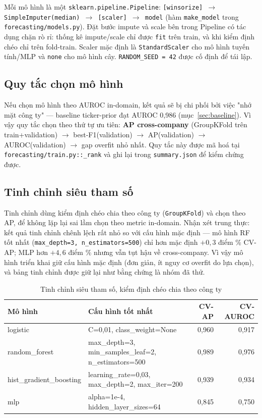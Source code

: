 Mỗi mô hình là một \texttt{sklearn.pipeline.Pipeline}:
\texttt{[winsorize] $\rightarrow$ SimpleImputer(median) $\rightarrow$ [scaler] $\rightarrow$ model}
(hàm \texttt{make\_model} trong \texttt{forecasting/models.py}). Đặt bước impute và scale bên trong
Pipeline có tác dụng chặn rò rỉ: thống kê impute/scale chỉ được \texttt{fit} trên train, và khi kiểm
định chéo chỉ trên fold-train. Scaler mặc định là \texttt{StandardScaler} cho mô hình tuyến
tính/MLP và \texttt{none} cho mô hình cây. \texttt{RANDOM\_SEED = 42} được cố định để tái lập.

\subsection{Quy tắc chọn mô hình}

Nếu chọn mô hình theo AUROC in-domain, kết quả sẽ bị chi phối bởi việc "nhớ mặt công ty" — baseline
ticker-prior đạt AUROC 0,986 (mục~\ref{sec:baseline}). Vì vậy quy tắc chọn theo thứ tự ưu tiên:
\textbf{AP cross-company} (GroupKFold trên train+validation) $\rightarrow$ best-F1(validation)
$\rightarrow$ AP(validation) $\rightarrow$ AUROC(validation) $\rightarrow$ gap overfit nhỏ nhất. Quy
tắc này được mã hoá tại \texttt{forecasting/train.py::\_rank} và ghi lại trong \texttt{summary.json}
để kiểm chứng được.

\subsection{Tinh chỉnh siêu tham số}

Tinh chỉnh dùng kiểm định chéo chia theo công ty (\texttt{GroupKFold}) và chọn theo AP, để không lặp
lại sai lầm chọn theo metric in-domain. Nhận xét trung thực: kết quả tinh chỉnh chênh lệch rất nhỏ
so với cấu hình mặc định — mô hình RF tốt nhất (\texttt{max\_depth=3, n\_estimators=500}) chỉ hơn
mặc định $+0{,}3$ điểm \% CV-AP; MLP hơn $+4{,}6$ điểm \% nhưng vẫn tụt hậu về cross-company. Vì
vậy mô hình triển khai giữ cấu hình mặc định (đơn giản, ít nguy cơ overfit do lựa chọn), và bảng
tinh chỉnh được giữ lại như bằng chứng là nhóm đã thử.

\begin{table}[H]
\centering
\caption{Tinh chỉnh siêu tham số, kiểm định chéo chia theo công ty}
\label{tab:tuning}
\begin{tabular}{|l|l|r|r|}
\hline
\textbf{Mô hình} & \textbf{Cấu hình tốt nhất} & \textbf{CV-AP} & \textbf{CV-AUROC} \\
\hline
logistic & C=0,01, class\_weight=None & 0,960 & 0,917 \\
random\_forest & max\_depth=3, min\_samples\_leaf=2, n\_estimators=500 & 0,989 & 0,976 \\
hist\_gradient\_boosting & learning\_rate=0,03, max\_depth=2, max\_iter=200 & 0,939 & 0,934 \\
mlp & alpha=1e-4, hidden\_layer\_sizes=64 & 0,845 & 0,750 \\
\hline
\end{tabular}
\end{table}


